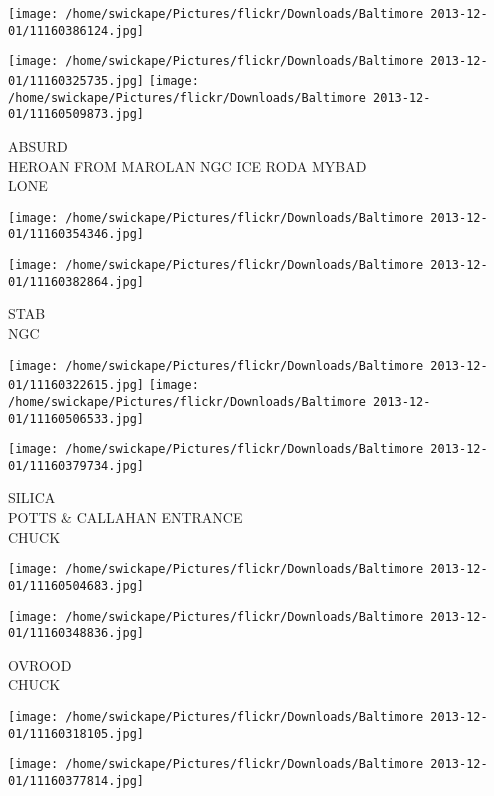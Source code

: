 \documentclass[10pt,letterpaper]{article}
\begin{document}
\texttt{[image: /home/swickape/Pictures/flickr/Downloads/Baltimore 2013-12-01/11160386124.jpg]}

\vspace{0.25in}
\texttt{[image: /home/swickape/Pictures/flickr/Downloads/Baltimore 2013-12-01/11160325735.jpg]}
\texttt{[image: /home/swickape/Pictures/flickr/Downloads/Baltimore 2013-12-01/11160509873.jpg]}

ABSURD\\
HEROAN FROM MAROLAN NGC ICE RODA MYBAD\\
LONE\\
\pagebreak

\texttt{[image: /home/swickape/Pictures/flickr/Downloads/Baltimore 2013-12-01/11160354346.jpg]}

\vspace{0.25in}
\texttt{[image: /home/swickape/Pictures/flickr/Downloads/Baltimore 2013-12-01/11160382864.jpg]}

STAB\\
NGC\\
\pagebreak

\texttt{[image: /home/swickape/Pictures/flickr/Downloads/Baltimore 2013-12-01/11160322615.jpg]}
\texttt{[image: /home/swickape/Pictures/flickr/Downloads/Baltimore 2013-12-01/11160506533.jpg]}

\texttt{[image: /home/swickape/Pictures/flickr/Downloads/Baltimore 2013-12-01/11160379734.jpg]}

SILICA\\
POTTS \& CALLAHAN ENTRANCE\\
CHUCK\\
\pagebreak

\texttt{[image: /home/swickape/Pictures/flickr/Downloads/Baltimore 2013-12-01/11160504683.jpg]}

\vspace{0.25in}
\texttt{[image: /home/swickape/Pictures/flickr/Downloads/Baltimore 2013-12-01/11160348836.jpg]}

OVROOD\\
CHUCK\\
\pagebreak

\texttt{[image: /home/swickape/Pictures/flickr/Downloads/Baltimore 2013-12-01/11160318105.jpg]}

\vspace{0.25in}
\texttt{[image: /home/swickape/Pictures/flickr/Downloads/Baltimore 2013-12-01/11160377814.jpg]}
\end{document}
